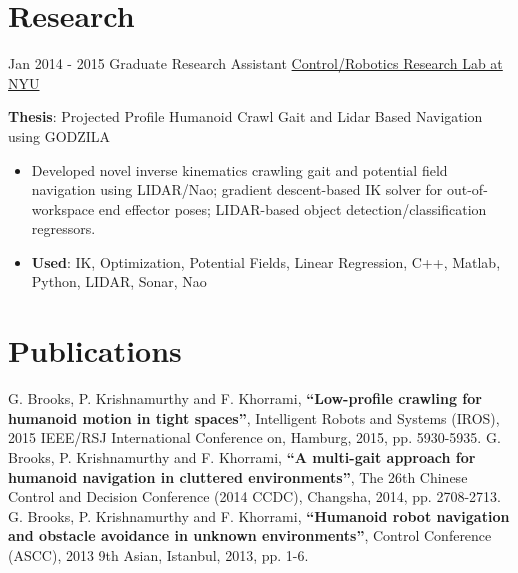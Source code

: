 \documentclass[letterpaper]{twentysecondcv} %
\begin{document}
\section{Research}
\begin{twenty}
	\twentyitem
    	{Jan 2014 -}
		{2015}
        {Graduate Research Assistant}
        {\href{http://crrl.poly.edu/}{Control/Robotics Research Lab at NYU}}
        {}
        {
       	\textbf{Thesis}: Projected Profile Humanoid Crawl Gait and Lidar Based Navigation using GODZILA
        {\begin{itemize}
          \item Developed novel inverse kinematics crawling gait and potential field navigation using LIDAR/Nao;
                gradient descent-based IK solver for out-of-workspace end effector poses;
                LIDAR-based object detection/classification regressors.
          \item \textbf{Used}: IK, Optimization, Potential Fields, Linear Regression, C++, Matlab, Python, LIDAR, Sonar, Nao
		\end{itemize}}
        }
\end{twenty}

\section{Publications}
G. Brooks, P. Krishnamurthy and F. Khorrami, \textbf{“Low-profile crawling for humanoid motion in tight spaces”}, Intelligent Robots and Systems (IROS), 2015 IEEE/RSJ International Conference on, Hamburg, 2015, pp. 5930-5935.\vspace{2mm}
G. Brooks, P. Krishnamurthy and F. Khorrami, \textbf{“A multi-gait approach for humanoid navigation in cluttered environments”}, The 26th Chinese Control and Decision Conference (2014 CCDC), Changsha, 2014, pp. 2708-2713.\vspace{2mm}
G. Brooks, P. Krishnamurthy and F. Khorrami, \textbf{“Humanoid robot navigation and obstacle avoidance in unknown environments”}, Control Conference (ASCC), 2013 9th Asian, Istanbul, 2013, pp. 1-6.\vspace{2mm}
\end{document}

